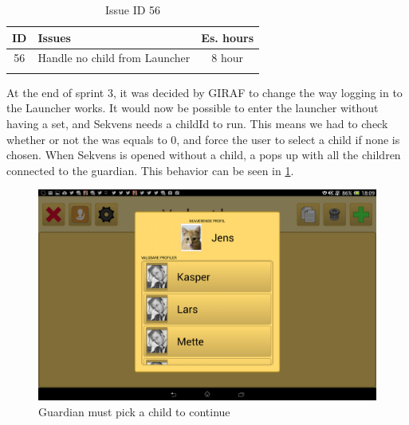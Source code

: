 \begin{longtable} { | c | p{12cm} | c | } 
\hline
	ID 	&	Issues	&		 Es. hours \\\hline
	56	&	Handle no child from Launcher	&	8 hour	\\\hline
\caption{Issue ID 56}
\label{tab:spr4_nochildfromlauncher}
\end{longtable}

At the end of sprint 3, it was decided by GIRAF to change the way logging in to the Launcher works. It would now be possible to enter the launcher without having a  set, and Sekvens needs a childId to run. This means we had to check whether or not the  was equals to 0, and force the user to select a child if none is chosen. When Sekvens is opened without a child, a  pops up with all the children connected to the guardian. This behavior can be seen in \ref{fig:profileselector}.

\begin{figure}[H]
	\centering
	\includegraphics[width=\textwidth]{Pics/Sprint4/profileselector.png}
	\caption{Guardian must pick a child to continue}
	\label{fig:profileselector}
\end{figure}